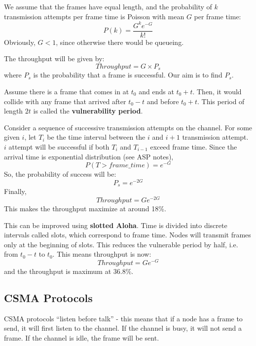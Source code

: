 \documentclass[12pt,letterpaper]{book}
\theoremstyle{definition}
\begin{document}
We assume that the frames have equal length, and the probability of $k$ transmission attempts per frame time is Poisson with mean $G$ per frame time:
\[P(k) = \frac{G^k e^{-G}}{k!}\]
Obviously, $G < 1$, since otherwise there would be queueing.

The throughput will be given by:
\[Throughput = G \times P_s\]
where $P_s$ is the probability that a frame is successful. Our aim is to find $P_s$.

Assume there is a frame that comes in at $t_0$ and ends at $t_0+t$. Then, it would collide with any frame that arrived after $t_0-t$ and before $t_0+t$. This period of length $2t$ is called the \textbf{vulnerability period}. 

Consider a sequence of successive transmission attempts on the channel. For some given $i$, let $T_i$ be the time interval between the $i$ and $i+1$ transmission attempt. $i$ attempt will be successful if both $T_i$ and $T_{i-1}$ exceed frame time. Since the arrival time is exponential distribution (see ASP notes),
\[P(T > frame\_time) = e^{-G}\]
So, the probability of success will be:
\[P_s = e^{-2G}\]
Finally, 
\[Throughput = G e^{-2G}\]
This makes the throughput maximize at around 18\%.

This can be improved using \textbf{slotted Aloha}. Time is divided into discrete intervals called slots, which correspond to frame time. Nodes will transmit frames only at the beginning of slots. This reduces the vulnerable period by half, i.e. from $t_0-t$ to $t_0$. This means throughput is now:
\[Throughput = G e^{-G}\]
and the throughput is maximum at 36.8\%.

\subsection{CSMA Protocols}

CSMA protocols ``listen before talk'' - this means that if a node has a frame to send, it will first listen to the channel. If the channel is busy, it will not send a frame. If the channel is idle, the frame will be sent.
\end{document}
